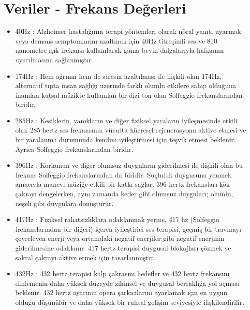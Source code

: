 \documentclass[12pt, a4paper]{article}
\begin{document}
	\section{Veriler - Frekans Değerleri}\vspace*{1\baselineskip}
	\begin{itemize}
		\item 40Hz  : Alzheimer hastalığının terapi yöntemleri olarak nöral yanıtı uyarmak veya demans semptomlarını azaltmak için 40Hz titreşimli ses ve 810 nanometre ışık frekansı kullanılarak gama beyin dalgalarıyla hafızanın uyarılmasına sağlanmıştır. 
		
		\item 174Hz : Hem ağrının hem de stresin azaltılması ile ilişkili olan 174Hz, alternatif tıpta insan sağlığı üzerinde farklı olumlu etkilere sahip olduğuna inanılan kutsal müzikte kullanılan bir dizi ton olan Solfeggio frekanslarından biridir.
		
		\item 285Hz : Kesiklerin, yanıkların ve diğer fiziksel yaraların iyileşmesinde etkili olan 285 hertz ses frekansının vücutta hücresel rejenerasyonu aktive etmesi ve bir yaralanma durumunda kendini iyileştirmesi için teşvik etmesi beklenir. Ayrıca Solfeggio frekanslarından biridir.
		
		\item 396Hz : Korkunun ve diğer olumsuz duyguların giderilmesi ile ilişkili olan bu frekans Solfeggio frekanslarından da biridir. Suçluluk duygusunu yenmek amacıyla manevi müziğe etkili bir katkı sağlar. 396 hertz frekansları kök çakrayı dengelerken, aynı zamanda keder gibi olumsuz duyguları; olumlu, neşeli gibi duygulara dönüştürür. 
		
		\item 417Hz : Fiziksel rahatsızlıklara odaklanmak yerine, 417 hz (Solfeggio frekanslarından bir diğeri) içeren iyileştirici ses terapisi, geçmiş bir travmayı çevreleyen enerji veya ortamdaki negatif enerjiler gibi negatif enerjinin giderilmesine odaklanır. 417 hertz terapisi duygusal blokajları çözmek ve sakral çakrayı aktive etmek için tasarlanmıştır. 
		
		\item 432Hz : 432 hertz terapisi kalp çakrasını hedefler ve 432 hertz frekansını dinlemenin daha yüksek düzeyde zihinsel ve duygusal berraklığa yol açması beklenir. 432 hertz ayarının opera şarkıcılarını ayarlamak için en uygun olduğu düşünülür ve daha yüksek bir ruhsal gelişim seviyesiyle ilişkilendirilir.
		

\end{itemize}
\end{document}
